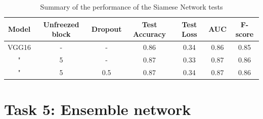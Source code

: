 \documentclass[11pt,a4paper,oneside]{article}
\begin{document}
\begin{table}
\centering
	\begin{tabular}{|ccc|cccc|}
	\hline
	Model & Unfreezed block & Dropout & Test Accuracy & Test Loss & AUC & F-score \\
	\hline
	VGG16 & - & -   & 0.86 & 0.34 & 0.86 & 0.85 \\
	"     & 5 & -   & 0.87 & 0.33 & 0.87 & 0.86 \\
	"	  & 5 & 0.5 & 0.87 & 0.34 & 0.87 & 0.86 \\
	\hline
	\end{tabular}
\caption{Summary of the performance of the Siamese Network tests}
\end{table}

\clearpage

\section{Task 5: Ensemble network}
\end{document}
